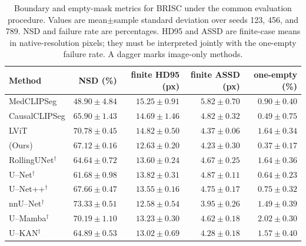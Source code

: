 \begin{table}[htbp]
\centering
\caption{Boundary and empty-mask metrics for BRISC under the common evaluation procedure. Values are mean$\pm$sample standard deviation over seeds 123, 456, and 789. NSD and failure rate are percentages. HD95 and ASSD are finite-case means in native-resolution pixels; they must be interpreted jointly with the one-empty failure rate. A dagger marks image-only methods.}
\label{tab:supp_boundary_medclipseg_brisc}
\footnotesize
\setlength{\tabcolsep}{4.0pt}
\begin{tabular}{@{}lrrrr@{}}
\toprule
Method & NSD (\%) & finite HD95 (px) & finite ASSD (px) & one-empty (\%) \\
\midrule
MedCLIPSeg & $48.90\pm4.84$ & $15.25\pm0.91$ & $5.82\pm0.70$ & $0.90\pm0.40$ \\
CausalCLIPSeg & $65.90\pm1.43$ & $14.69\pm1.46$ & $4.82\pm0.32$ & $0.49\pm0.75$ \\
LViT & $70.78\pm0.45$ & $14.82\pm0.50$ & $4.37\pm0.06$ & $1.64\pm0.34$ \\
\methodname{} (Ours) & $67.12\pm0.16$ & $12.63\pm0.20$ & $4.23\pm0.30$ & $0.37\pm0.17$ \\
RollingUNet$^\dagger$ & $64.64\pm0.72$ & $13.60\pm0.24$ & $4.67\pm0.25$ & $1.64\pm0.36$ \\
U--Net$^\dagger$ & $61.68\pm0.98$ & $13.82\pm0.31$ & $4.87\pm0.11$ & $0.64\pm0.23$ \\
U--Net++$^\dagger$ & $67.66\pm0.47$ & $13.55\pm0.16$ & $4.75\pm0.17$ & $0.75\pm0.32$ \\
nnU--Net$^\dagger$ & $73.33\pm0.51$ & $12.58\pm0.54$ & $3.95\pm0.26$ & $1.49\pm0.39$ \\
U--Mamba$^\dagger$ & $70.19\pm1.10$ & $13.23\pm0.30$ & $4.62\pm0.18$ & $2.02\pm0.30$ \\
U--KAN$^\dagger$ & $64.89\pm0.53$ & $13.02\pm0.69$ & $4.28\pm0.18$ & $1.57\pm0.40$ \\
\bottomrule
\end{tabular}
\end{table}

